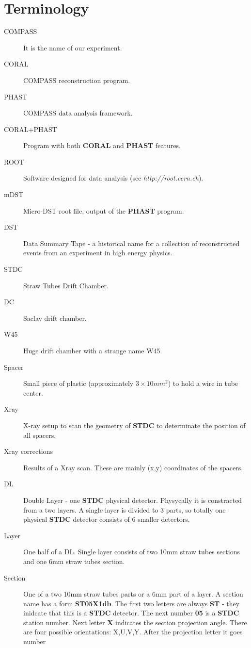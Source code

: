 \documentclass[a4paper,12pt]{article}
\begin{document}
\section{Terminology}
\begin{description}
\item[COMPASS] It is the name of our experiment.
\item[CORAL] COMPASS reconstruction program.
\item[PHAST] COMPASS data analysis framework.
\item[CORAL+PHAST] Program with both {\bf CORAL} and {\bf PHAST} features.
\item[ROOT] Software designed for data analysis (see {\it http://root.cern.ch}).
\item[mDST] Micro-DST root file, output of the {\bf PHAST} program.
\item[DST] Data Summary Tape - a historical name for a collection of
      reconstructed events from an experiment in high energy physics.
\item[STDC] Straw Tubes Drift Chamber.
\item[DC] Saclay drift chamber.
\item[W45] Huge drift chamber with a strange name W45.
\item[Spacer] Small piece of plastic (approximately $3 \times 10 mm^2$) to hold a wire
      in tube center.
\item[Xray] X-ray setup to scan the geometry of {\bf STDC} to determinate
        the position of all spacers.
\item[Xray corrections] Results of a Xray scan. These are mainly
        (x,y) coordinates of the spacers.
\item[DL] Double Layer - one {\bf STDC} physical detector. Physycally it is
        constracted from a two layers. A single layer is divided to 3 parts,
        so totally one physical {\bf STDC} detector consists of 6 smaller
        detectors.
\item[Layer] One half of a DL. Single layer consists of two 10mm
        straw tubes sections and one 6mm straw tubes section.
\item[Section] One of a two 10mm straw tubes parts or a 6mm part of
        a layer. A section name has a form {\bf ST05X1db}. The first two
        letters are always {\bf ST} - they inidcate that this is a {\bf STDC}
        detector. The next number {\bf 05} is a {\bf STDC} station number.
        Next letter {\bf X} indicates the section projection angle. There are four
        possible orientations: X,U,V,Y. After the projection letter it goes number

\end{description}
\end{document}
